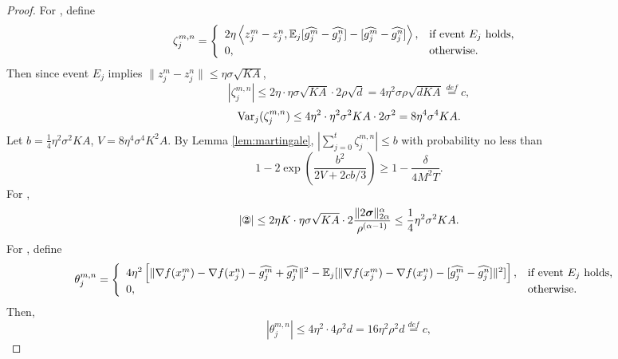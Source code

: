 \documentclass{article} %
\numberwithin{equation}{section}
\newcommand{\cirone}{\text{\ding{172}}}
\newcommand{\cirtwo}{\text{\ding{173}}}
\newcommand{\cirthree}{\text{\ding{174}}}
\begin{document}
\begin{proof}
    For \cirone, define
    \begin{equation}
        \zeta_j^{m,n}=\left\{
            \begin{array}{ll}
                2\eta\left\langle z_j^m-z_j^n,\mathbb{E}_j[\widehat{g_j^m} - \widehat{g_j^n}] - [\widehat{g_j^m} - \widehat{g_j^n}] \right\rangle, & \text{if event $E_j$ holds, } \\
                0 ,& \text{otherwise.}
            \end{array}
        \right.
    \end{equation}
    Then since event $E_j$ implies $\|z_j^m-z_j^n\|\leq \eta\sigma \sqrt{KA}$,
    \begin{equation}
        |\zeta_j^{m,n}|\leq 2\eta\cdot \eta\sigma \sqrt{KA} \cdot 2\rho\sqrt{d}=4\eta^2\sigma\rho\sqrt{dKA}\overset{def}{=}c,
    \end{equation}
    \begin{equation}
        \mathrm{Var}_j(\zeta_j^{m,n}) \leq 4\eta^2 \cdot \eta^2\sigma^2KA \cdot 2\sigma^2=8\eta^4\sigma^4KA.
    \end{equation}
    Let $b=\frac{1}{4}\eta^2\sigma^2KA$, $V=8\eta^4\sigma^4K^2A$.
    By Lemma \ref{lem:martingale}, $|\sum_{j=0}^t\zeta_j^{m,n}|\leq b$ with probability no less than
    \begin{equation}
        1-2\exp\left(\frac{b^2}{2V+2cb/3}\right)\geq 1-\frac{\delta}{4M^2T}.
    \end{equation}
    For \cirtwo, 
    \begin{equation}
        |\cirtwo|\leq 2\eta K \cdot \eta\sigma\sqrt{KA}\cdot 2\frac{\|2\boldsymbol{\sigma}\|_{2\alpha}^{\alpha}}{\rho^{(\alpha-1)}}\leq \frac{1}{4}\eta^2\sigma^2KA.
    \end{equation}
    For \cirthree, define
    \begin{equation}
        \theta_j^{m,n}=\left\{
            \begin{array}{ll}
                4\eta^2\left[\|\nabla f(x_j^m)-\nabla f(x_j^n)-\widehat{g_j^m} + \widehat{g_j^n}\|^2-\mathbb{E}_j[\|\nabla f(x_j^m)-\nabla f(x_j^n)-[\widehat{g_j^m} - \widehat{g_j^n}]\|^2]\right], & \text{if event $E_j$ holds, } \\
                0 ,& \text{otherwise.}
            \end{array}
        \right.
    \end{equation}
    Then,
    \begin{equation}
        |\theta_j^{m,n}|\leq 4\eta^2\cdot 4\rho^2d = 16\eta^2\rho^2d \overset{def}{=}c,
    \end{equation}

\end{proof}
\end{document}
